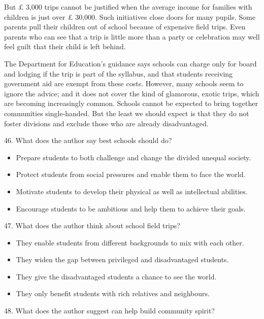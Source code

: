 \documentclass[UTF8,11pt]{ctexart}
\begin{document}
But £ 3,000 trips cannot be justified when the average income for families with children is just over £ 30,000. Such initiatives close doors for many pupils. Some parents pull their children out of school because of expensive field trips. Even parents who can see that a trip is little more than a party or celebration may well feel guilt that their child is left behind.


The Department for Education's guidance says schools can charge only for board and lodging if the trip is part of the syllabus, and that students receiving government aid are exempt from these costs. However, many schools seem to ignore the advice; and it does not cover the kind of glamorous, exotic trips, which are becoming increasingly common. Schools cannot be expected to bring together communities single-handed. But the least we should expect is that they do not foster divisions and exclude those who are already disadvantaged.


46. What does the author say best schools should do?


\begin{itemize}[leftmargin=2em,itemsep=.2em,topsep=.4em]\item[A.] Prepare students to both challenge and change the divided unequal society.
\item[B.] Protect students from social pressures and enable them to face the world.
\item[C.] Motivate students to develop their physical as well as intellectual abilities.
\item[D.] Encourage students to be ambitious and help them to achieve their goals.
\end{itemize}

47. What does the author think about school field trips?


\begin{itemize}[leftmargin=2em,itemsep=.2em,topsep=.4em]\item[A.] They enable students from different backgrounds to mix with each other.
\item[B.] They widen the gap between privileged and disadvantaged students.
\item[C.] They give the disadvantaged students a chance to see the world.
\item[D.] They only benefit students with rich relatives and neighbours.
\end{itemize}

48. What does the author suggest can help build community spirit?
\end{document}
